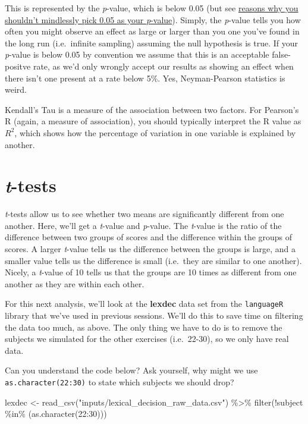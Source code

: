\documentclass[
]{book}
\newenvironment{Shaded}{\begin{snugshade}}{\end{snugshade}}
\newcommand{\DecValTok}[1]{\textcolor[rgb]{0.00,0.00,0.81}{#1}}
\newcommand{\FunctionTok}[1]{\textcolor[rgb]{0.00,0.00,0.00}{#1}}
\newcommand{\NormalTok}[1]{#1}
\newcommand{\OtherTok}[1]{\textcolor[rgb]{0.56,0.35,0.01}{#1}}
\newcommand{\SpecialCharTok}[1]{\textcolor[rgb]{0.00,0.00,0.00}{#1}}
\newcommand{\StringTok}[1]{\textcolor[rgb]{0.31,0.60,0.02}{#1}}
\begin{document}
This is represented by the \emph{p}-value, which is below 0.05 (but see \href{https://psyarxiv.com/9s3y6}{reasons why you shouldn't mindlessly pick 0.05 as your \emph{p}-value}). Simply, the \emph{p}-value tells you how often you might observe an effect as large or larger than you one you've found in the long run (i.e.~infinite sampling) assuming the null hypothesis is true. If your \emph{p}-value is below 0.05 by convention we assume that this is an acceptable false-positve rate, as we'd only wrongly accept our results as showing an effect when there isn't one present at a rate below 5\%. Yes, Neyman-Pearson statistics is weird.

Kendall's Tau is a measure of the association between two factors. For Pearson's R (again, a measure of association), you should typically interpret the R value as \(R^2\), which shows how the percentage of variation in one variable is explained by another.

\hypertarget{t-tests}{%
\section{\texorpdfstring{\emph{t}-tests}{t-tests}}\label{t-tests}}

\emph{t}-tests allow us to see whether two means are significantly different from one another. Here, we'll get a \emph{t}-value and \emph{p}-value. The \emph{t}-value is the ratio of the difference between two groups of scores and the difference within the groups of scores. A larger \emph{t}-value tells us the difference between the groups is large, and a smaller value tells us the difference is small (i.e.~they are similar to one another). Nicely, a \emph{t}-value of 10 tells us that the groups are 10 times as different from one another as they are within each other.

For this next analysis, we'll look at the \textbf{lexdec} data set from the \texttt{languageR} library that we've used in previous sessions. We'll do this to save time on filtering the data too much, as above. The only thing we have to do is to remove the subjects we simulated for the other exercises (i.e.~22-30), so we only have real data.

Can you understand the code below? Ask yourself, why might we use \texttt{as.character(22:30)} to state which subjects we should drop?

\begin{Shaded}
\begin{Highlighting}[]
\NormalTok{lexdec }\OtherTok{\textless{}{-}} \FunctionTok{read\_csv}\NormalTok{(}\StringTok{"inputs/lexical\_decision\_raw\_data.csv"}\NormalTok{) }\SpecialCharTok{\%\textgreater{}\%}
  \FunctionTok{filter}\NormalTok{(}\SpecialCharTok{!}\NormalTok{subject }\SpecialCharTok{\%in\%}\NormalTok{ (}\FunctionTok{as.character}\NormalTok{(}\DecValTok{22}\SpecialCharTok{:}\DecValTok{30}\NormalTok{)))}
\end{Highlighting}
\end{Shaded}
\end{document}

